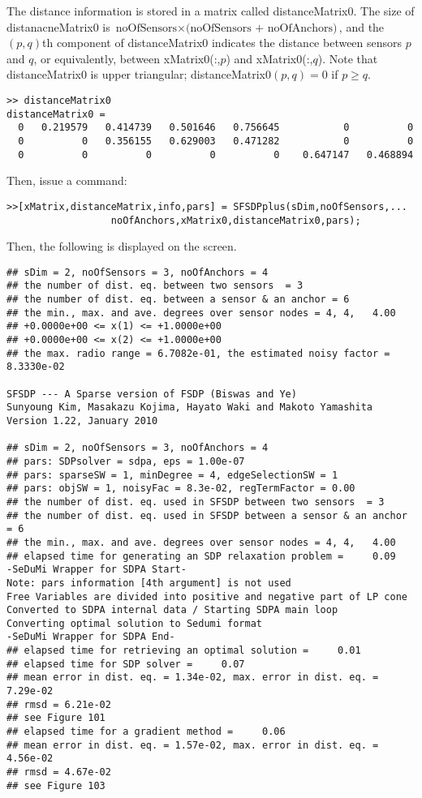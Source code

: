\documentclass[12pt]{article}
\begin{document}
The distance information is stored in a 
matrix called distanceMatrix0.
The size of distanacneMatrix0 is $\mbox{noOfSensors} \times \mbox{(noOfSensors +
noOfAnchors)}$,  and 
the $(p,q)$th component of
distanceMatrix0  indicates the distance between sensors $p$ and $q$, or equivalently, between
xMatrix0(:,$p$) and xMatrix0(:,$q$).  Note that distanceMatrix0 is upper triangular; 
distanceMatrix0$(p,q) = 0$ if $p \geq q$.
\begin{verbatim}    
>> distanceMatrix0
distanceMatrix0 =
  0   0.219579   0.414739   0.501646   0.756645           0          0
  0          0   0.356155   0.629003   0.471282           0          0
  0          0          0          0          0    0.647147   0.468894
\end{verbatim}    
 Then, issue a command: 
 \begin{verbatim}
>>[xMatrix,distanceMatrix,info,pars] = SFSDPplus(sDim,noOfSensors,...
                  noOfAnchors,xMatrix0,distanceMatrix0,pars);
\end{verbatim}    
Then, the following is displayed on the screen.
\begin{verbatim}
## sDim = 2, noOfSensors = 3, noOfAnchors = 4
## the number of dist. eq. between two sensors  = 3
## the number of dist. eq. between a sensor & an anchor = 6
## the min., max. and ave. degrees over sensor nodes = 4, 4,   4.00
## +0.0000e+00 <= x(1) <= +1.0000e+00
## +0.0000e+00 <= x(2) <= +1.0000e+00
## the max. radio range = 6.7082e-01, the estimated noisy factor = 8.3330e-02

SFSDP --- A Sparse version of FSDP (Biswas and Ye)
Sunyoung Kim, Masakazu Kojima, Hayato Waki and Makoto Yamashita
Version 1.22, January 2010

## sDim = 2, noOfSensors = 3, noOfAnchors = 4
## pars: SDPsolver = sdpa, eps = 1.00e-07
## pars: sparseSW = 1, minDegree = 4, edgeSelectionSW = 1
## pars: objSW = 1, noisyFac = 8.3e-02, regTermFactor = 0.00
## the number of dist. eq. used in SFSDP between two sensors  = 3
## the number of dist. eq. used in SFSDP between a sensor & an anchor = 6
## the min., max. and ave. degrees over sensor nodes = 4, 4,   4.00
## elapsed time for generating an SDP relaxation problem =     0.09
-SeDuMi Wrapper for SDPA Start-
Note: pars information [4th argument] is not used
Free Variables are divided into positive and negative part of LP cone
Converted to SDPA internal data / Starting SDPA main loop
Converting optimal solution to Sedumi format
-SeDuMi Wrapper for SDPA End-
## elapsed time for retrieving an optimal solution =     0.01
## elapsed time for SDP solver =     0.07
## mean error in dist. eq. = 1.34e-02, max. error in dist. eq. = 7.29e-02
## rmsd = 6.21e-02
## see Figure 101
## elapsed time for a gradient method =     0.06
## mean error in dist. eq. = 1.57e-02, max. error in dist. eq. = 4.56e-02
## rmsd = 4.67e-02
## see Figure 103
\end{verbatim}
\end{document}
